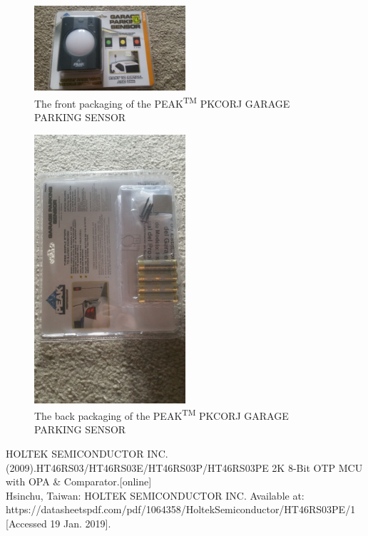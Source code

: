 \documentclass[journal]{IEEEtran}
\begin{document}
\newpage

\appendix

\begin{figure}[h]
  \includegraphics[width=0.5\textwidth]{img/img1.jpg}
  \caption{The front packaging of the  PEAK\textsuperscript{TM} PKCORJ GARAGE PARKING SENSOR}
  \label{fig:img1}
\end{figure}

\begin{figure}[h]
  \includegraphics[width=0.5\textwidth, angle= 180,origin=c]{img/img2.jpg}
  \caption{The back packaging of the  PEAK\textsuperscript{TM} PKCORJ GARAGE PARKING SENSOR}
  \label{fig:img2}
\end{figure}

\begin{thebibliography}{1}

HOLTEK SEMICONDUCTOR INC.(2009).HT46RS03/HT46RS03E/HT46RS03P/HT46RS03PE 2K 8-Bit OTP MCU with OPA \& Comparator.[online]\\ 
 Hsinchu, Taiwan: HOLTEK SEMICONDUCTOR INC. Available at:\\ 
 https://datasheetspdf.com/pdf/1064358/HoltekSemiconductor/HT46RS03PE/1 [Accessed 19 Jan. 2019].

\end{thebibliography}


\end{document}
